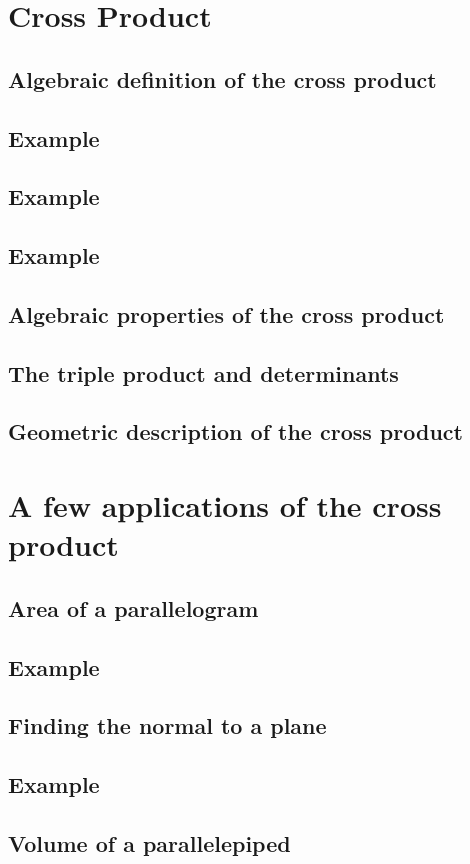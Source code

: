 \section{Cross Product}
\subsection{Algebraic definition of the cross product}
\subsection{Example}
\subsection{Example}
\subsection{Example}
\subsection{Algebraic properties of the cross product}
\subsection{The triple product and determinants}
\subsection{Geometric description of the cross product}
\section{A few applications of the cross product}
\subsection{Area of a parallelogram}
\subsection{Example}
\subsection{Finding the normal to a plane}
\subsection{Example}
\subsection{Volume of a parallelepiped}
